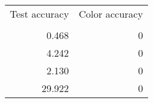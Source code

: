 \begin{tabular}{rr}
\toprule
 Test accuracy &  Color accuracy \\
               &                 \\
\midrule
         0.468 &               0 \\
         4.242 &               0 \\
         2.130 &               0 \\
        29.922 &               0 \\
\bottomrule
\end{tabular}
